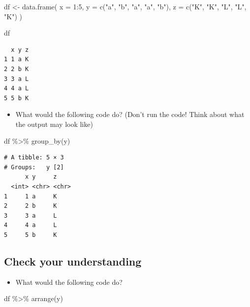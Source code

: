 \documentclass[
  letterpaper,
  DIV=11,
  numbers=noendperiod]{scrartcl}
\newenvironment{Shaded}{\begin{snugshade}}{\end{snugshade}}
\newcommand{\AttributeTok}[1]{\textcolor[rgb]{0.40,0.45,0.13}{#1}}
\newcommand{\DecValTok}[1]{\textcolor[rgb]{0.68,0.00,0.00}{#1}}
\newcommand{\FunctionTok}[1]{\textcolor[rgb]{0.28,0.35,0.67}{#1}}
\newcommand{\NormalTok}[1]{\textcolor[rgb]{0.00,0.23,0.31}{#1}}
\newcommand{\OtherTok}[1]{\textcolor[rgb]{0.00,0.23,0.31}{#1}}
\newcommand{\SpecialCharTok}[1]{\textcolor[rgb]{0.37,0.37,0.37}{#1}}
\newcommand{\StringTok}[1]{\textcolor[rgb]{0.13,0.47,0.30}{#1}}
\providecommand{\tightlist}{%
  \setlength{\itemsep}{0pt}\setlength{\parskip}{0pt}}
\begin{document}
\begin{Shaded}
\begin{Highlighting}[]
\NormalTok{df }\OtherTok{\textless{}{-}} \FunctionTok{data.frame}\NormalTok{(}
     \AttributeTok{x =} \DecValTok{1}\SpecialCharTok{:}\DecValTok{5}\NormalTok{,}
     \AttributeTok{y =} \FunctionTok{c}\NormalTok{(}\StringTok{"a"}\NormalTok{, }\StringTok{"b"}\NormalTok{, }\StringTok{"a"}\NormalTok{, }\StringTok{"a"}\NormalTok{, }\StringTok{"b"}\NormalTok{),}
     \AttributeTok{z =} \FunctionTok{c}\NormalTok{(}\StringTok{"K"}\NormalTok{, }\StringTok{"K"}\NormalTok{, }\StringTok{"L"}\NormalTok{, }\StringTok{"L"}\NormalTok{, }\StringTok{"K"}\NormalTok{)}
\NormalTok{)}

\NormalTok{df}
\end{Highlighting}
\end{Shaded}

\begin{verbatim}
  x y z
1 1 a K
2 2 b K
3 3 a L
4 4 a L
5 5 b K
\end{verbatim}

\begin{itemize}
\tightlist
\item
  What would the following code do? (Don't run the code! Think about
  what the output may look like)
\end{itemize}

\begin{Shaded}
\begin{Highlighting}[]
\NormalTok{df }\SpecialCharTok{\%\textgreater{}\%} \FunctionTok{group\_by}\NormalTok{(y)}
\end{Highlighting}
\end{Shaded}

\begin{verbatim}
# A tibble: 5 × 3
# Groups:   y [2]
      x y     z
  <int> <chr> <chr>
1     1 a     K
2     2 b     K
3     3 a     L
4     4 a     L
5     5 b     K
\end{verbatim}

\subsection{Check your understanding}\label{check-your-understanding-1}

\begin{itemize}
\tightlist
\item
  What would the following code do?
\end{itemize}

\begin{Shaded}
\begin{Highlighting}[]
\NormalTok{df }\SpecialCharTok{\%\textgreater{}\%} \FunctionTok{arrange}\NormalTok{(y)}
\end{Highlighting}
\end{Shaded}
\end{document}
